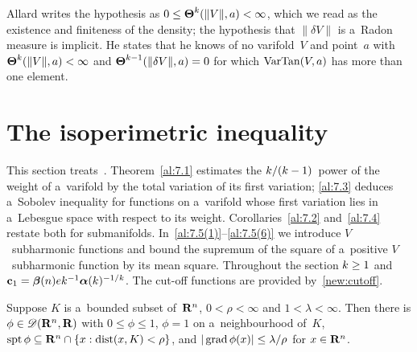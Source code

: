 \begin{remark}
    \label{rem:6.5}
    Allard writes the hypothesis as $0 \le \boldsymbol{\Theta}^{k}(\|V\|,a) < \infty$, which we read as
    the existence and finiteness of the density; the hypothesis that $\|\delta V\|$ is a~Radon
    measure is implicit. He states that he knows of no varifold~$V$ and point~$a$ with
    $\boldsymbol{\Theta}^{k}(\|V\|,a) < \infty$ and $\boldsymbol{\Theta}^{k-1}(\|\delta V\|,a) = 0$ for which
    $\operatorname{VarTan}(V,a)$ has more than one element.
\end{remark}

\section{The isoperimetric inequality}
\label{sec:isoperimetric}

\begin{miniremark}
    \label{mr:sec7}
    This section treats~\cite[section~7]{Allard1972}. Theorem~\ref{al:7.1} estimates the
    $k/(k-1)$~power of the weight of a~varifold by the total variation of its first
    variation; \ref{al:7.3} deduces a~Sobolev inequality for functions on a~varifold whose first
    variation lies in a~Lebesgue space with respect to its weight. Corollaries~\ref{al:7.2}
    and~\ref{al:7.4} restate both for submanifolds. In~\ref{al:7.5(1)}--\ref{al:7.5(6)} we
    introduce $V$~subharmonic functions and bound the supremum of the square of a~positive
    $V$~subharmonic function by its mean square. Throughout the section $k \ge 1$ and
    $\mathbf{c}_1 = \boldsymbol{\beta}(n) e k^{-1} \boldsymbol{\alpha}(k)^{-1/k}$. The cut-off
    functions are provided by~\ref{new:cutoff}.
\end{miniremark}

\begin{lemma}[new]
    \label{new:cutoff}
    Suppose $K$ is a~bounded subset of~$\mathbf{R}^{n}$, $0 < \rho < \infty$ and $1 < \lambda <
    \infty$. Then there is $\phi \in \mathscr{D}(\mathbf{R}^{n},\mathbf{R})$ with $0 \le \phi \le 1$, $\phi = 1$
    on a~neighbourhood of~$K$, $\operatorname{spt} \phi \subseteq \mathbf{R}^{n} \cap \{ x : \operatorname{dist}(x,K) < \rho \}$,
    and $|\operatorname{grad} \phi(x)| \le \lambda / \rho$ for $x \in \mathbf{R}^{n}$.
\end{lemma}

